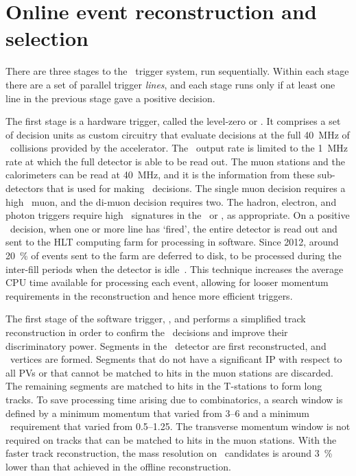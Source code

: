 \section{Online event reconstruction and selection}
\label{chap:intro:lhcb:trigger}

There are three stages to the \lhcb\ trigger system, run sequentially.
Within each stage there are a set of parallel trigger \emph{lines}, and each 
stage runs only if at least one line in the previous stage gave a positive 
decision.

The first stage is a hardware trigger, called the level-zero or \lzero.
It comprises a set of decision units as custom circuitry that evaluate 
decisions at the full \SI{40}{\mega\hertz} of \pp\ collisions provided by the 
accelerator.
The \lzero\ output rate is limited to the \SI{1}{\mega\hertz} rate at which the 
full detector is able to be read out.
The muon stations and the calorimeters can be read at \SI{40}{\mega\hertz}, and 
it is the information from these sub-detectors that is used for making \lzero\ 
decisions.
The single muon decision requires a high \pT\ muon, and the di-muon decision 
requires two.
The hadron, electron, and photon triggers require high \ET\ signatures in the 
\hcal\ or \ecal, as appropriate.
On a positive \lzero\ decision, when one or more line has `fired', the entire 
detector is read out and sent to the \ac{HLT} computing farm for processing in 
software.
Since 2012, around \SI{20}{\percent} of events sent to the farm are deferred to 
disk, to be processed during the inter-fill periods when the detector is 
idle~\cite{1742-6596-513-1-012006}.
This technique increases the average CPU time available for processing each 
event, allowing for looser momentum requirements in the reconstruction and 
hence more efficient triggers.

The first stage of the software trigger, \hltone, and performs a simplified 
track reconstruction in order to confirm the \lzero\ decisions and improve 
their discriminatory power.
Segments in the \velo\ detector are first reconstructed, and \pp\ vertices are 
formed.
Segments that do not have a significant \ac{IP} with respect to all \acp{PV} or 
that cannot be matched to hits in the muon stations are discarded.
The remaining segments are matched to hits in the T-stations to form long 
tracks.
To save processing time arising due to combinatorics, a search window is 
defined by a minimum momentum that varied from \SIrange{3}{6}{\GeVc} and a 
minimum \pT\ requirement that varied from \SIrange{0.5}{1.25}{\GeVc}.
The transverse momentum window is not required on tracks that can be matched to 
hits in the muon stations.
With the faster track reconstruction, the mass resolution on \JpsiTomumu\ 
candidates is around \SI{3}{\percent} lower than that achieved in the offline 
reconstruction.

